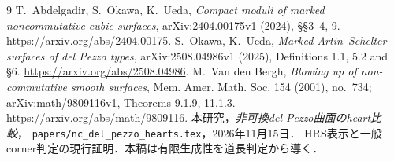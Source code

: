 \documentclass[11pt,a4paper]{ltjsarticle}
\theoremstyle{definition}\newtheorem{remark}[theorem]{注意}
\begin{document}
\begin{thebibliography}{9}
 T.~Abdelgadir, S.~Okawa, K.~Ueda,
\emph{Compact moduli of marked noncommutative cubic surfaces},
arXiv:2404.00175v1 (2024), \S\S3--4, 9.
\url{https://arxiv.org/abs/2404.00175}.
 S.~Okawa, K.~Ueda,
\emph{Marked Artin--Schelter surfaces of del Pezzo types},
arXiv:2508.04986v1 (2025), Definitions 1.1, 5.2 and \S6.
\url{https://arxiv.org/abs/2508.04986}.
 M.~Van den Bergh,
\emph{Blowing up of non-commutative smooth surfaces},
Mem. Amer. Math. Soc. 154 (2001), no.~734;
arXiv:math/9809116v1, Theorems 9.1.9, 11.1.3.
\url{https://arxiv.org/abs/math/9809116}.
 本研究，\emph{非可換del Pezzo曲面のheart比較}，
\texttt{papers/nc\_del\_pezzo\_hearts.tex}，2026年11月15日．
HRS表示と一般corner判定の現行証明．本稿は有限生成性を道長判定から導く．
\end{thebibliography}
\end{document}
